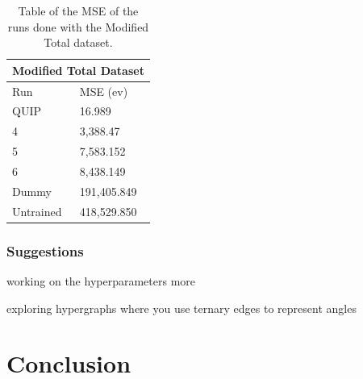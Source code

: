 \documentclass[12pt, abstract = true]{scrartcl}
\begin{document}
\begin{table}
    \centering
    \begin{tabular}{p{3cm}|p{3cm}}
    \hline
    \multicolumn{2}{|c|}{Modified Total Dataset} \\
    \hline
    Run  & MSE (ev)\\
    \hline
    QUIP   & 16.989 \\
    4   & 3,388.47 \\
    5 & 7,583.152 \\
    6    & 8,438.149\\
    Dummy & 191,405.849 \\
    Untrained & 418,529.850\\
    \hline
    \end{tabular}
    \caption{Table of the MSE of the runs done with the Modified Total dataset.}\label{tab:total}
\end{table}



\subsubsection{Suggestions} 
working on the hyperparameters more

exploring hypergraphs where you use ternary edges to represent angles
\newpage

\section{Conclusion}

\newpage



\end{document}
